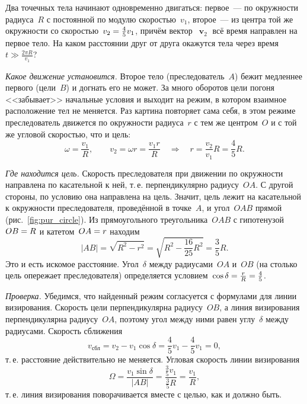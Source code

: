 \documentclass[../main.tex]{subfiles}
\begin{document}
\begin{example}
Два точечных тела начинают одновременно двигаться: первое~--- по окружности радиуса~$R$ с постоянной по модулю скоростью~$v_1$, второе~--- из центра той же окружности
со скоростью~$v_2 \hm= \frac{4}{5}v_1$, причём вектор~$\mbfv_2$ всё время направлен на
первое тело. На каком расстоянии друг от друга окажутся тела через время~$t \gg \frac{2\pi R}{v_1}$?


\noindent\textit{Какое движение установится.} Второе тело (преследователь~$A$) бежит
медленнее первого (цели~$B$) и догнать его не может. За много оборотов цели погоня
<<забывает>> начальные условия и выходит на режим, в котором взаимное расположение
тел не меняется. Раз картина повторяет сама себя, в этом режиме преследователь
движется по окружности радиуса~$r$ с тем же центром~$O$ и с той же угловой скоростью,
что и цель:
\[
\omega = \frac{v_1}{R},
\qquad
v_2 = \omega r = \frac{v_1 r}{R}
\quad\Rightarrow\quad
r = \frac{v_2}{v_1}R = \frac{4}{5}R.
\]

\noindent\textit{Где находится цель.} Скорость преследователя при движении по
окружности направлена по касательной к ней, т.\,е. перпендикулярно радиусу~$OA$. С
другой стороны, по условию она направлена на цель. Значит, цель лежит на касательной
к окружности преследователя, проведённой в точке~$A$, и угол~$OAB$ прямой
(рис.~\ref{fig:pur_circle}). Из прямоугольного треугольника~$OAB$ с гипотенузой~$OB \hm= R$ и катетом~$OA \hm= r$ находим
\[
|AB| = \sqrt{R^2 - r^2} = \sqrt{R^2 - \frac{16}{25}R^2} = \frac{3}{5}R.
\]
Это и есть искомое расстояние. Угол~$\delta$ между радиусами~$OA$ и~$OB$ (на столько
цель опережает преследователя) определяется условием~$\cos\delta \hm= \frac{r}{R} \hm= \frac{4}{5}$.

\noindent\textit{Проверка.} Убедимся, что найденный режим согласуется с формулами для
линии визирования. Скорость цели перпендикулярна радиусу~$OB$, а линия визирования
перпендикулярна радиусу~$OA$, поэтому угол между ними равен углу~$\delta$ между
радиусами. Скорость сближения
\[
v_{\text{сбл}} = v_2 - v_1\cos\delta = \frac{4}{5}v_1 - \frac{4}{5}v_1 = 0,
\]
т.\,е. расстояние действительно не меняется. Угловая скорость линии визирования
\[
\Omega = \frac{v_1\sin\delta}{|AB|} = \frac{\frac{3}{5}v_1}{\frac{3}{5}R} = \frac{v_1}{R},
\]
т.\,е. линия визирования поворачивается вместе с целью, как и должно быть.


\end{example}
\end{document}
